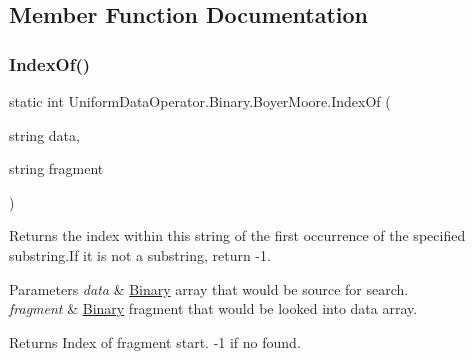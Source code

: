\subsection{Member Function Documentation}
\mbox{\label{class_uniform_data_operator_1_1_binary_1_1_boyer_moore_abd5f37407f9c6ab55a7d537e65bdd22c}} 
\subsubsection{\texorpdfstring{Index\+Of()}{IndexOf()}\hspace{0.1cm}{\footnotesize\ttfamily [1/2]}}
{\footnotesize\ttfamily static int Uniform\+Data\+Operator.\+Binary.\+Boyer\+Moore.\+Index\+Of (\begin{DoxyParamCaption}\item[{string}]{data,  }\item[{string}]{fragment }\end{DoxyParamCaption})\hspace{0.3cm}{\ttfamily [static]}}



Returns the index within this string of the first occurrence of the specified substring.\+If it is not a substring, return -\/1. 


\begin{DoxyParams}{Parameters}
{\em data} & \mbox{\hyperlink{namespace_uniform_data_operator_1_1_binary}{Binary}} array that would be source for search.\\
\hline
{\em fragment} & \mbox{\hyperlink{namespace_uniform_data_operator_1_1_binary}{Binary}} fragment that would be looked into data array.\\
\hline
\end{DoxyParams}
\begin{DoxyReturn}{Returns}
Index of fragment start. -\/1 if no found.
\end{DoxyReturn}
\mbox{\label{class_uniform_data_operator_1_1_binary_1_1_boyer_moore_abf651c244965e9d5da5a9b5af10a77b5}} 
